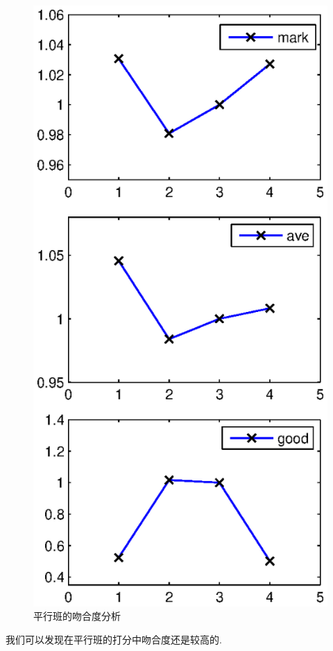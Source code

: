 \documentclass[a4paper]{article}
\begin{document}
  \begin{figure}[H]
  \centerline{\includegraphics[scale=0.5]{coincidenorm.eps}}
  \caption{平行班的吻合度分析}
  \end{figure}
  我们可以发现在平行班的打分中吻合度还是较高的.
\end{document}
